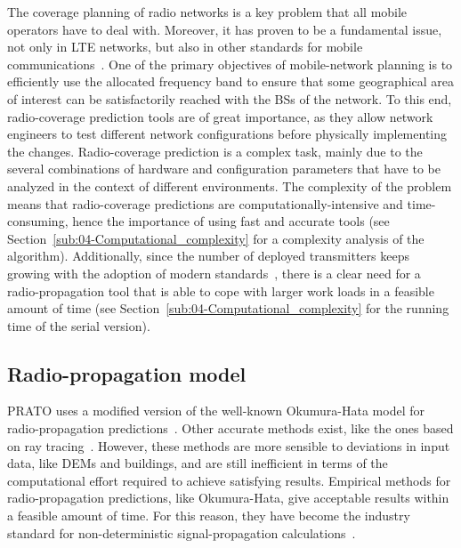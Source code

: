 The coverage planning of radio networks is a key problem that all
mobile operators have to deal with. Moreover, it has proven to be
a fundamental issue, not only in LTE networks, but also in other standards
for mobile communications~\cite{Saleh_On_the_coveraga_extension_in_LTE_networks:2010,Shabbir_Comparison_of_radio_propagation_models:2011,Siomina:Minimum.pilot.power.for.service.coverage,Valcarce_Applying.FDTD.to.the.coverage.prediction.of.WiMAX:2009}.
One of the primary objectives of mobile-network planning is to efficiently
use the allocated frequency band to ensure that some geographical
area of interest can be satisfactorily reached with the BSs of the
network. To this end, radio-coverage prediction tools are of great
importance, as they allow network engineers to test different network
configurations before physically implementing the changes. Radio-coverage
prediction is a complex task, mainly due to the several combinations
of hardware and configuration parameters that have to be analyzed
in the context of different environments. The complexity of the problem
means that radio-coverage predictions are computationally-intensive
and time-consuming, hence the importance of using fast and accurate
tools (see Section~\ref{sub:04-Computational_complexity} for a complexity
analysis of the algorithm). Additionally, since the number of deployed
transmitters keeps growing with the adoption of modern standards~\cite{Saleh_On_the_coveraga_extension_in_LTE_networks:2010},
there is a clear need for a radio-propagation tool that is able to
cope with larger work loads in a feasible amount of time (see Section~\ref{sub:04-Computational_complexity}
for the running time of the serial version).


\subsection{Radio-propagation model \label{sub:04-Radio_propagation_model}}

PRATO uses a modified version of the well-known Okumura-Hata model
for radio-propagation predictions~\cite{Hata_Empirical_formula_for_propagation_loss_in_land_mobile_radio_services:1980}.
Other accurate methods exist, like the ones based on ray tracing~\cite{Corre_Three_dimensional_urban_EM_wave_propagation_model_for_radio_network_planning_and_optimization_over_large_areas:2009,Vilhar-Efficient_open_source_ray_tracing_methods_for_rural_environment:efficient}.
However, these methods are more sensible to deviations in input data,
like DEMs and buildings, and are still inefficient in terms of the
computational effort required to achieve satisfying results. Empirical
methods for radio-propagation predictions, like Okumura-Hata, give
acceptable results within a feasible amount of time. For this reason,
they have become the industry standard for non-deterministic signal-propagation
calculations~\cite{Begovic_Applicability_evaluation_of_Okumura_Ericsson_and_Winner_propagation_models_for_coverage_planning:2012,Cichon_Propagation.prediction.models:1995,Hata_Empirical_formula_for_propagation_loss_in_land_mobile_radio_services:1980,Shabbir_Comparison_of_radio_propagation_models:2011,Song_Evolved_cellular_network_planning_and_optimization_for_UMTS_and_LTE:2010}.

